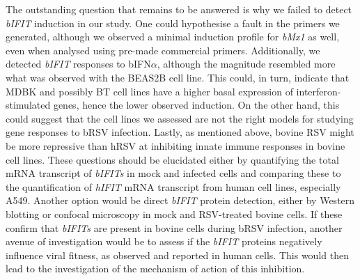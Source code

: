 The outstanding question that remains to be answered is why we failed to detect \textit{bIFIT} induction in our study. One could hypothesise a fault in the primers we generated, although we observed a minimal induction profile for \textit{bMx1} as well, even when analysed using pre-made commercial primers. Additionally, we detected \textit{bIFIT} responses to bIFN$\alpha$, although the magnitude resembled more what was observed with the BEAS2B cell line. This could, in turn, indicate that MDBK and possibly BT cell lines have a higher basal expression of interferon-stimulated genes, hence the lower observed induction. On the other hand, this could suggest that the cell lines we assessed are not the right models for studying gene responses to bRSV infection. Lastly, as mentioned above, bovine RSV might be more repressive than hRSV at inhibiting innate immune responses in bovine cell lines. These questions should be elucidated either by quantifying the total mRNA transcript of \textit{bIFITs} in mock and infected cells and comparing these to the quantification of \textit{hIFIT} mRNA transcript from human cell lines, especially A549. Another option would be direct \textit{bIFIT} protein detection, either by Western blotting or confocal microscopy in mock and RSV-treated bovine cells. If these confirm that \textit{bIFITs} are present in bovine cells during bRSV infection, another avenue of investigation would be to assess if the \textit{bIFIT} proteins negatively influence viral fitness, as observed and reported in human cells. This would then lead to the investigation of the mechanism of action of this inhibition.

